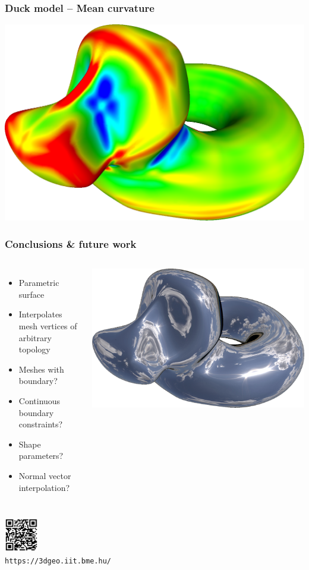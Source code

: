 \documentclass{beamer}
\begin{document}
\begin{frame}
  \frametitle{Duck model -- Mean curvature}
  \centering
  \includegraphics[width=.85\textwidth]{images/bob-mean.png}
\end{frame}

\begin{frame}
  \frametitle{Conclusions \& future work}
  \begin{columns}   
    \begin{itemize}
    \item Parametric surface
    \item Interpolates mesh vertices of arbitrary topology
    \item Meshes with boundary?
    \item Continuous boundary constraints?
    \item Shape parameters?
    \item Normal vector interpolation?
    \end{itemize}
    \centering
    \includegraphics[width=\textwidth]{images/bob-env.png}
  \end{columns}
  \vspace{1em}
  \centering
  \includegraphics[height=4em]{images/qrcode.pdf}\\
  \texttt{https://3dgeo.iit.bme.hu/}
\end{frame}
\end{document}

